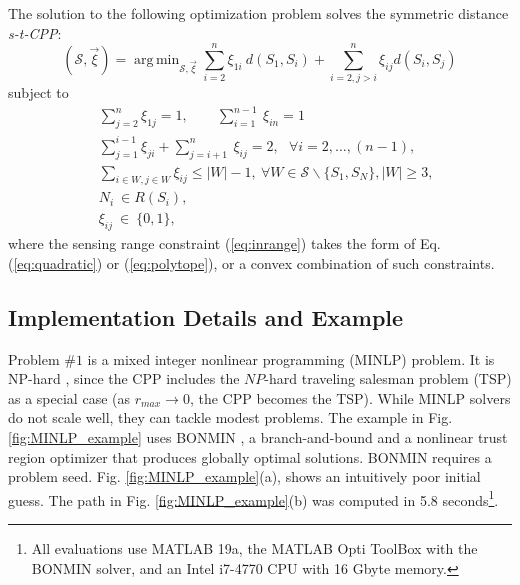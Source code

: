 \documentclass[letterpaper, 10 pt, conference]{ieeeconf}
\theoremstyle{definition}
\DeclareMathOperator*{\argmin}{arg\,min}
\begin{document}
 The solution to the following optimization problem solves the symmetric distance {\em s-t-CPP}:\\
  \begin{equation}\label{eq:OptProblem}
    (\mathcal{S},\vec{\xi}) =  \argmin_{\mathcal{S},\vec{\xi}} \sum_{i=2}^n \xi_{1i}\ d(S_1,S_i)
             +\sum_{i=2,j> i}^n \xi_{ij} d(S_i,S_j)
  \end{equation}
subject to
\begin{eqnarray}
  && \sum_{j=2}^n \xi_{1j} = 1, \quad \quad \sum_{i=1}^{n-1}\ \xi_{in} = 1 \label{eq:edge} \\
  && \sum_{j=1}^{i-1} \xi_{ji} + \sum_{j=i+1}^n\ \xi_{ij} = 2, \ \ \ \forall i=2,\ldots,(n-1),
               \label{eq:node_constraint}\\
  && \sum_{i\in W,j\in W} \xi_{ij} \le |W|-1, \ \forall W\in \mathcal{S} \backslash \{S_1,S_N\}, |W|\ge 3,
       \ \ \          \label{eq:subtour}\\
  && N_i\ \in R(S_i), \label{eq:inrange}\\
  &&  \xi_{ij}\ \in \ \{0,1\}, \label{eq:binary}
\end{eqnarray}
where the sensing range constraint (\ref{eq:inrange}) takes the form of Eq. (\ref{eq:quadratic}) or (\ref{eq:polytope}), or a convex combination of such constraints.

\subsection{Implementation Details and Example}

\noindent Problem $\# 1$ is a mixed integer nonlinear programming (MINLP) problem.  It is NP-hard \cite{current_efficient_1994}, since the CPP includes the $NP$-hard traveling salesman problem (TSP) as a special case (as $r_{max}\rightarrow 0$, the CPP becomes the TSP).  While MINLP solvers do not scale well,  they can tackle modest problems. The example in Fig. \ref{fig:MINLP_example} uses BONMIN \cite{BONMIN}, a branch-and-bound and a nonlinear trust region optimizer that produces globally optimal solutions.  BONMIN requires a problem seed.  Fig. \ref{fig:MINLP_example}(a), shows an intuitively poor initial guess.  The path in Fig. \ref{fig:MINLP_example}(b) was computed in 5.8 seconds\footnote{All evaluations use MATLAB 19a, the MATLAB Opti ToolBox\cite{OptiToolbox} with the BONMIN solver, and an Intel i7-4770 CPU with 16 Gbyte memory.}.
\end{document}
